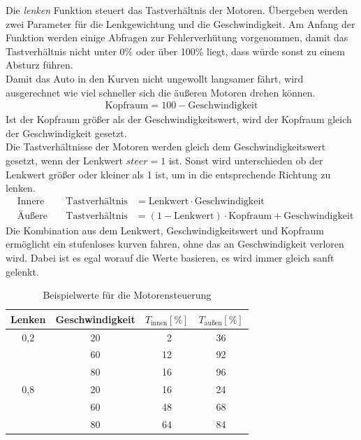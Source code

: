 \documentclass[a4paper, 12pt]{scrartcl}
\begin{document}
Die \textit{lenken} Funktion steuert das Tastverhältnis der Motoren. Übergeben werden zwei Parameter für die Lenkgewichtung und die Geschwindigkeit.
Am Anfang der Funktion werden einige Abfragen zur Fehlerverhütung vorgenommen, damit das Tastverhältnis nicht unter 0\% oder über 100\% liegt, dass würde sonst zu einem Absturz führen.\\
Damit das Auto in den Kurven nicht ungewollt langsamer fährt, wird ausgerechnet wie viel schneller sich die äußeren  Motoren drehen können.
\begin{align}
	\text{Kopfraum} = 100-\text{Geschwindigkeit}
\end{align}
Ist der Kopfraum größer als der Geschwindigkeitswert, wird der Kopfraum gleich der Geschwindigkeit gesetzt.\\

Die Tastverhältnisse der Motoren werden gleich dem Geschwindigkeitswert gesetzt, wenn der Lenkwert $steer=1$ ist. Sonst wird unterschieden ob der Lenkwert größer oder kleiner als 1 ist, um in die entsprechende Richtung zu lenken.
\begin{align}
	&\text{Innere Motoren:} &\text{Tastverhältnis} &= \text{Lenkwert}\cdot\text{Geschwindigkeit}\\
	&\text{Äußere Motoren:} &\text{Tastverhältnis} &= (1-\text{Lenkwert})\cdot\text{Kopfraum}+\text{Geschwindigkeit}
\end{align}
Die Kombination aus dem Lenkwert, Geschwindigkeitswert und Kopfraum ermöglicht ein stufenloses kurven fahren, ohne das an Geschwindigkeit verloren wird. Dabei ist es egal worauf die Werte basieren, es wird immer gleich sanft gelenkt.

\begin{table}[th!]
	\centering
	\caption{Beispielwerte für die Motorensteuerung}
	\begin{tabular}{c|c|c|c}
		Lenken & Geschwindigkeit & $T_{\text{innen}} [\%]$ &  $T_{\text{au\ss en}}[\%]$ \\ \hline 
		0,2 & 20 & \ 2 & 36 \\  
		    & 60 & 12  & 92 \\    
		    & 80 & 16  & 96 \\ \hline
		0,8 & 20 & 16  & 24 \\
		    & 60 & 48  & 68 \\
		    & 80 & 64  & 84 \\
	\end{tabular} 
\end{table}

\newpage
\end{document}
